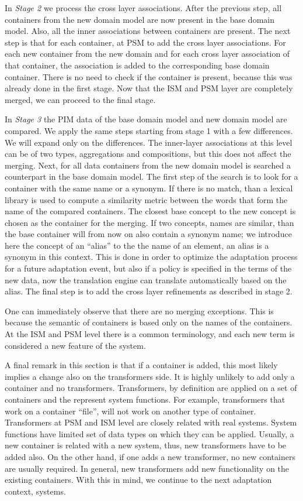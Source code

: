 \documentclass{sig-alternate}
\begin{document}
In \textit{Stage 2} we process the cross layer associations.
After the previous step, all containers from the new domain model are now present in the base domain model.
Also, all the inner associations between containers are present.
The next step is that for each container, at PSM to add the cross layer associations.
For each new container from the new domain and for each cross layer association of that container,
the association is added to the corresponding base domain container. 
There is no need to check if the container is present, because this was already done in the first stage.
Now that the ISM and PSM layer are completely merged, we can proceed to the final stage.

In \textit{Stage 3} the PIM data of the base domain model and new domain model are compared.
We apply the same steps starting from stage 1 with a few differences. We will expand only on the differences.
The inner-layer associations at this level can be of two types, aggregations and compositions, but this does not affect the merging.
Next, for all data containers from the new domain model is searched a counterpart in the base domain model. 
The first step of the search is to look for a container with the same name or a synonym.
If there is no match, than a lexical library is used to compute a similarity metric between the words that form the name of the compared containers.
The closest base concept to the new concept is chosen as the container for the merging.
If two concepts, names are similar, than the base container will from now on also contain a synonym name;
we introduce here the concept of an ``alias'' to the the name of an element, an alias is a synonym in this context.
This is done in order to optimize the adaptation process for a future adaptation event, 
but also if a policy is specified in the terms of the new data, now the translation engine can translate automatically based on the alias.
The final step is to add the cross layer refinements as described in stage 2.

One can immediately observe that there are no merging exceptions. 
This is because the semantic of containers is based only on the names of the containers.
At the ISM and PSM level there is a common terminology, and each new term is considered a new feature of the system.

A final remark in this section is that if a container is added, this most likely implies a change also on the transformers side.
It is highly unlikely to add only a container and no transformers.
Transformers, by definition are applied on a set of containers and the represent system functions.
For example, transformers that work on a container ``file'', will not work on another type of container.
Transformers at PSM and ISM level are closely related with real systems. 
System functions have limited set of data types on which they can be applied.
Usually, a new container is related with a new system, thus, new transformers have to be added also.
On the other hand, if one adds a new transformer, no new containers are usually required.
In general, new transformers add new functionality on the existing containers.
With this in mind, we continue to the next adaptation context, systems.
\end{document}
